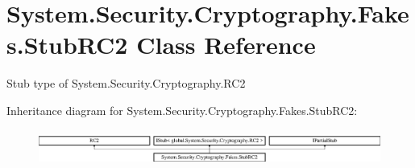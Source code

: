 \hypertarget{class_system_1_1_security_1_1_cryptography_1_1_fakes_1_1_stub_r_c2}{\section{System.\-Security.\-Cryptography.\-Fakes.\-Stub\-R\-C2 Class Reference}
\label{class_system_1_1_security_1_1_cryptography_1_1_fakes_1_1_stub_r_c2}
}


Stub type of System.\-Security.\-Cryptography.\-R\-C2 


Inheritance diagram for System.\-Security.\-Cryptography.\-Fakes.\-Stub\-R\-C2\-:\begin{figure}[H]
\begin{center}
\leavevmode
\includegraphics[height=1.200429cm]{class_system_1_1_security_1_1_cryptography_1_1_fakes_1_1_stub_r_c2}
\end{center}
\end{figure}
